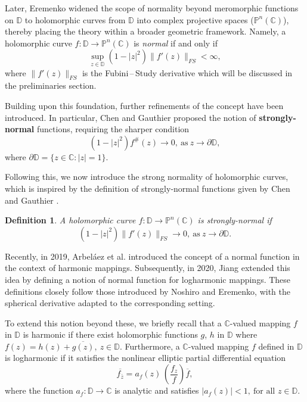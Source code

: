 \documentclass[10pt,a4paper]{amsart}
\newtheorem{definition}[theorem]{Definition}
\numberwithin{equation}{section}
\begin{document}
Later, Eremenko \cite{eremenko-nhcfprtps-2007} widened the scope of normality beyond meromorphic functions on $\mathbb D$ to holomorphic curves from
$\mathbb D$ into complex projective spaces ($\mathbb P^n(\mathbb C)$), thereby placing the theory within a broader geometric framework. Namely, a holomorphic curve $f:\mathbb D\to \mathbb P^n(\mathbb C)$ is \emph{normal} if and only if 
\begin{equation*}\sup_{z\in\mathbb D}(1-|z|^2)\|f'(z)\|_{FS}<\infty,\end{equation*}
where $\|f'(z)\|_{FS}$ is the Fubini\,--\,Study derivative which will be discussed in the preliminaries section.
\smallskip

Building upon this foundation, further refinements of the concept have been introduced. In particular, Chen and Gauthier \cite{chen-osnf-1996} proposed the 
notion of \textbf{strongly-normal} functions, requiring the sharper condition
\begin{equation*}(1-|z|^2)f^\#(z)\to 0,\ \text{as}\ z\to \partial \mathbb{D},\end{equation*}
where $\partial\mathbb D=\{z\in\mathbb C:|z|=1\}$. 
\smallskip

Following this, we now introduce the strong normality of holomorphic curves, which
is inspired by the definition of strongly-normal functions given by Chen and Gauthier \cite{chen-osnf-1996}.
\begin{definition}
A holomorphic curve $f:\mathbb{D}\to \mathbb P^n(\mathbb C)$ is \emph{strongly-normal} if 
\begin{equation*}(1-|z|^2)\|f'(z)\|_{FS}\to 0,\ \text{as}\ z\to\partial\mathbb{D}.\end{equation*}
\end{definition}

Recently, in 2019, Arbeláez et al. \cite{arbelaez-nhm-2019} introduced the concept of a normal function in the context of harmonic mappings. Subsequently, in 
2020, Jiang \cite{jiang-nolm-2020} extended this idea by defining a notion of normal function for logharmonic 
mappings. These definitions closely follow those introduced by Noshiro and Eremenko, with the spherical derivative adapted to the corresponding setting. \smallskip

To extend this notion beyond these, we briefly recall that a $\mathbb C$-valued mapping $f$ in $\mathbb D$ 
is harmonic if there exist holomorphic functions $g$, $h$ in $\mathbb D$ where $f(z)=h(z)+\overline{g(z)},\ z\in\mathbb D$. Furthermore, a $\mathbb C$-valued 
mapping $f$ defined in $\mathbb D$ is logharmonic if it satisfies the nonlinear elliptic partial differential equation
\begin{equation*}
\overline{f_{\bar z}} = a_f(z)\,\left(\frac{f_z}{f}\right){\overline{f}}, \tag{i} \label{NLEPDE}
\end{equation*}
where the function $a_f : \mathbb D \to \mathbb{C}$ is analytic and satisfies $|a_f(z)| < 1,\  \text{for all } z \in \mathbb D.$%
\smallskip
    
\end{document}
